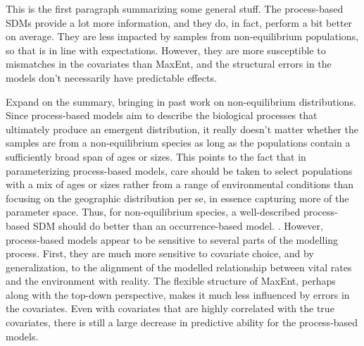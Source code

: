 \documentclass[preprint,review,times,12pt]{elsarticle}
\begin{document}
This is the first paragraph summarizing some general stuff. The process-based SDMs provide a lot more information, and they do, in fact, perform a bit better on average. They are less impacted by samples from non-equilibrium populations, so that is in line with expectations. However, they are more susceptible to mismatches in the covariates than MaxEnt, and the structural errors in the models don't necessarily have predictable effects. 

Expand on the summary, bringing in past work on non-equilibrium distributions. Since process-based models aim to describe the biological processes that ultimately produce an emergent distribution, it really doesn't matter whether the samples are from a non-equilibrium species as long as the populations contain a sufficiently broad span of ages or sizes. This points to the fact that in parameterizing process-based models, care should be taken to select populations with a mix of ages or sizes rather from a range of environmental conditions than focusing on the geographic distribution per se, in essence capturing more of the parameter space. Thus, for non-equilibrium species, a well-described process-based SDM should do better than an occurrence-based model.
.
However, process-based models appear to be sensitive to several parts of the modelling process. First, they are much more sensitive to covariate choice, and by generalization, to the alignment of the modelled relationship between vital rates and the environment with reality. The flexible structure of MaxEnt, perhaps along with the top-down perspective, makes it much less influenced by errors in the covariates. Even with covariates that are highly correlated with the true covariates, there is still a large decrease in predictive ability for the process-based models. 

\end{document}
